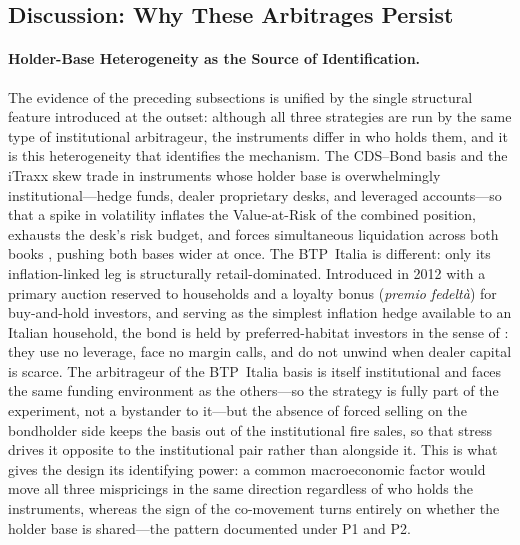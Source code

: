 
\subsection{Discussion: Why These Arbitrages Persist}
\label{sec:rq3_discussion}

\paragraph{Holder-Base Heterogeneity as the Source of Identification.}

The evidence of the preceding subsections is unified by the single
structural feature introduced at the outset: although all three
strategies are run by the same type of institutional arbitrageur, the
instruments differ in who holds them, and it is this heterogeneity that
identifies the mechanism. The CDS--Bond basis and the iTraxx skew trade
in instruments whose holder base is overwhelmingly
institutional---hedge funds, dealer proprietary desks, and leveraged
accounts---so that a spike in volatility inflates the Value-at-Risk of
the combined position, exhausts the desk's risk budget, and forces
simultaneous liquidation across both books \citep{brunnermeier2009market},
pushing both bases wider at once. The BTP~Italia is different: only its
inflation-linked leg is structurally retail-dominated. Introduced in
2012 with a primary auction reserved to households and a loyalty bonus
(\textit{premio fedelt\`{a}}) for buy-and-hold investors, and serving
as the simplest inflation hedge available to an Italian household, the
bond is held by preferred-habitat investors in the sense of
\citet{vayanos2021preferred}: they use no leverage, face no margin
calls, and do not unwind when dealer capital is scarce. The arbitrageur
of the BTP~Italia basis is itself institutional and faces the same
funding environment as the others---so the strategy is fully part of
the experiment, not a bystander to it---but the absence of forced
selling on the bondholder side keeps the basis out of the institutional
fire sales, so that stress drives it opposite to the institutional pair
rather than alongside it. This is what gives the design its identifying
power: a common macroeconomic factor would move all three mispricings
in the same direction regardless of who holds the instruments, whereas
the sign of the co-movement turns entirely on whether the holder base
is shared---the pattern documented under P1 and P2.

